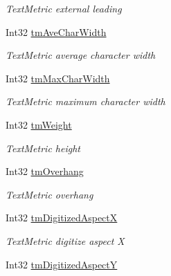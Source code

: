 \begin{DoxyCompactItemize}
\begin{DoxyCompactList}\small\item\em Text\+Metric external leading \end{DoxyCompactList}\item 
Int32 \hyperlink{class_pdf_file_writer_1_1_win_text_metric_ad0b01b1e5cef573cda0f42b8ed9a40cd}{tm\+Ave\+Char\+Width}
\begin{DoxyCompactList}\small\item\em Text\+Metric average character width \end{DoxyCompactList}\item 
Int32 \hyperlink{class_pdf_file_writer_1_1_win_text_metric_ae789d85e914eee551839a58c469e7022}{tm\+Max\+Char\+Width}
\begin{DoxyCompactList}\small\item\em Text\+Metric maximum character width \end{DoxyCompactList}\item 
Int32 \hyperlink{class_pdf_file_writer_1_1_win_text_metric_a2da79132edc1d90df886d2ecdeeedc5b}{tm\+Weight}
\begin{DoxyCompactList}\small\item\em Text\+Metric height \end{DoxyCompactList}\item 
Int32 \hyperlink{class_pdf_file_writer_1_1_win_text_metric_a9640f49736e8a6e59f23516f14481d82}{tm\+Overhang}
\begin{DoxyCompactList}\small\item\em Text\+Metric overhang \end{DoxyCompactList}\item 
Int32 \hyperlink{class_pdf_file_writer_1_1_win_text_metric_ab5d8d71b1b83243466b2bc74d4ef5340}{tm\+Digitized\+AspectX}
\begin{DoxyCompactList}\small\item\em Text\+Metric digitize aspect X \end{DoxyCompactList}\item 
Int32 \hyperlink{class_pdf_file_writer_1_1_win_text_metric_a31d296488e4cf7ca0696c207378e39ec}{tm\+Digitized\+AspectY}

\end{DoxyCompactItemize}
